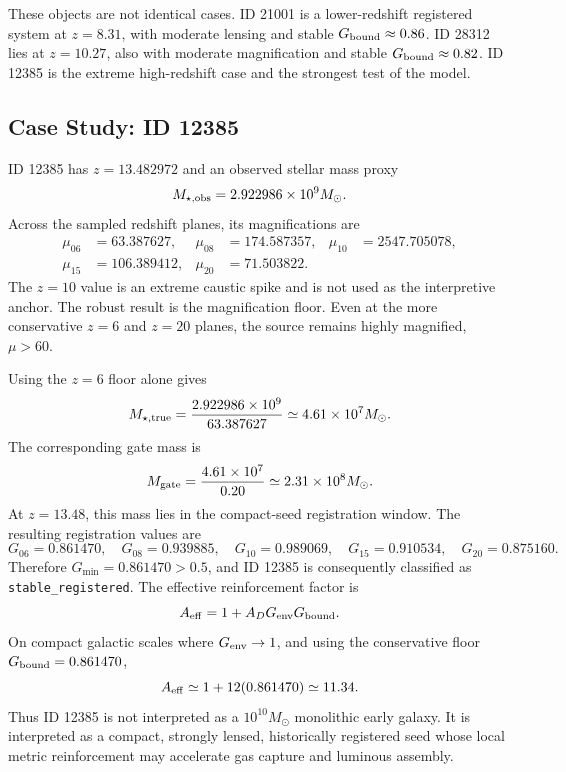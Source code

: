 \documentclass[11pt,a4paper]{article}
\newcommand{\Msun}{M_\odot}
\begin{document}
These objects are not identical cases. ID 21001 is a lower-redshift registered system at $z=8.31$, with moderate lensing and stable $G_{\rm bound}\approx0.86$. ID 28312 lies at $z=10.27$, also with moderate magnification and stable $G_{\rm bound}\approx0.82$. ID 12385 is the extreme high-redshift case and the strongest test of the model.

\subsection{Case Study: ID 12385}

ID 12385 has $z=13.482972$ and an observed stellar mass proxy
\begin{equation}
M_{\star,\rm obs}=2.922986\times10^9\Msun.
\end{equation}
Across the sampled redshift planes, its magnifications are
\begin{align}
\mu_{06}&=63.387627, & \mu_{08}&=174.587357, & \mu_{10}&=2547.705078,\nonumber\\
\mu_{15}&=106.389412, & \mu_{20}&=71.503822.\nonumber
\end{align}
The $z=10$ value is an extreme caustic spike and is not used as the interpretive anchor. The robust result is the magnification floor. Even at the more conservative $z=6$ and $z=20$ planes, the source remains highly magnified, $\mu>60$.

Using the $z=6$ floor alone gives
\begin{equation}
M_{\star,\rm true}=\frac{2.922986\times10^9}{63.387627}\simeq4.61\times10^7\Msun.
\end{equation}
The corresponding gate mass is
\begin{equation}
M_{\rm gate}=\frac{4.61\times10^7}{0.20}\simeq2.31\times10^8\Msun.
\end{equation}
At $z=13.48$, this mass lies in the compact-seed registration window. The resulting registration values are
\begin{equation}
G_{06}=0.861470,\quad
G_{08}=0.939885,\quad
G_{10}=0.989069,\quad
G_{15}=0.910534,\quad
G_{20}=0.875160.
\end{equation}
Therefore $G_{\min}=0.861470>0.5$, and ID 12385 is consequently classified as \texttt{stable\_registered}. The effective reinforcement factor is
\begin{equation}
A_{\rm eff}=1+A_DG_{\rm env}G_{\rm bound}.
\end{equation}
On compact galactic scales where $G_{\rm env}\rightarrow1$, and using the conservative floor $G_{\rm bound}=0.861470$,
\begin{equation}
A_{\rm eff}\simeq1+12(0.861470)\simeq11.34.
\end{equation}
Thus ID 12385 is not interpreted as a $10^{10}\Msun$ monolithic early galaxy. It is interpreted as a compact, strongly lensed, historically registered seed whose local metric reinforcement may accelerate gas capture and luminous assembly.
\end{document}
